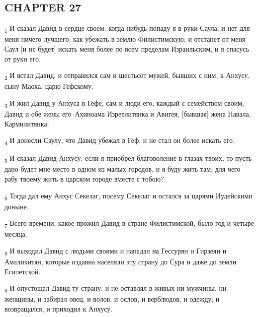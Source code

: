 \subsection{CHAPTER 27}
\begin{tcolorbox}
\textsubscript{1} И сказал Давид в сердце своем: когда-нибудь попаду я в руки Саула, и нет для меня ничего лучшего, как убежать в землю Филистимскую; и отстанет от меня Саул [и не будет] искать меня более по всем пределам Израильским, и я спасусь от руки его.
\end{tcolorbox}
\begin{tcolorbox}
\textsubscript{2} И встал Давид, и отправился сам и шестьсот мужей, бывших с ним, к Анхусу, сыну Маоха, царю Гефскому.
\end{tcolorbox}
\begin{tcolorbox}
\textsubscript{3} И жил Давид у Анхуса в Гефе, сам и люди его, каждый с семейством своим, Давид и обе жены его--Ахиноама Изреелитянка и Авигея, [бывшая] жена Навала, Кармилитянка.
\end{tcolorbox}
\begin{tcolorbox}
\textsubscript{4} И донесли Саулу, что Давид убежал в Геф, и не стал он более искать его.
\end{tcolorbox}
\begin{tcolorbox}
\textsubscript{5} И сказал Давид Анхусу: если я приобрел благоволение в глазах твоих, то пусть дано будет мне место в одном из малых городов, и я буду жить там; для чего рабу твоему жить в царском городе вместе с тобою?
\end{tcolorbox}
\begin{tcolorbox}
\textsubscript{6} Тогда дал ему Анхус Секелаг, посему Секелаг и остался за царями Иудейскими доныне.
\end{tcolorbox}
\begin{tcolorbox}
\textsubscript{7} Всего времени, какое прожил Давид в стране Филистимской, было год и четыре месяца.
\end{tcolorbox}
\begin{tcolorbox}
\textsubscript{8} И выходил Давид с людьми своими и нападал на Гессурян и Гирзеян и Амаликитян, которые издавна населяли эту страну до Сура и даже до земли Египетской.
\end{tcolorbox}
\begin{tcolorbox}
\textsubscript{9} И опустошал Давид ту страну, и не оставлял в живых ни мужчины, ни женщины, и забирал овец, и волов, и ослов, и верблюдов, и одежду; и возвращался, и приходил к Анхусу.
\end{tcolorbox}
